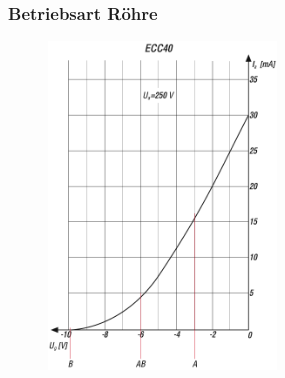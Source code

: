 \begin{frame}
  \frametitle{Betriebsart Röhre}
  \begin{center}
    \begin{figure}
      \includegraphics[width=0.54\textwidth,height=.7\textheight,keepaspectratio]{a07/Ia_Ug_Kennlinie_ECC40.png}
    \end{figure}
  \end{center}
\end{frame}

